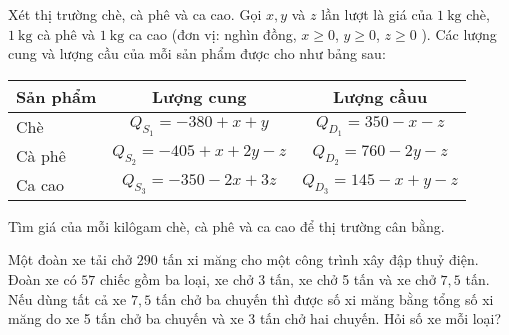 \begin{vd}%
	Xét thị trường chè, cà phê và ca cao. Gọi $x, y$ và $z$ lần lượt là giá của $1 \mathrm{~kg}$ chè, $1 \mathrm{~kg}$ cà phê và $1 \mathrm{~kg}$ ca cao (đơn vị: nghìn đồng, $x \geq 0$, $y \geq 0$, $z \geq 0$ ). Các lượng cung và lượng cầu của mỗi sản phẩm được cho như bảng sau:\begin{center}
	\begin{tabular}{|l|c|c|}
		\hline \multicolumn{1}{|c|}{ Sản phẩm } & Lượng cung & Lượng cầuu \\
		\hline Chè & $Q_{S_1}=-380+x+y$ & $Q_{D_1}=350-x-z$ \\
		\hline Cà phê & $Q_{S_2}=-405+x+2 y-z$ & $Q_{D_2}=760-2 y-z$ \\
		\hline Ca cao & $Q_{S_3}=-350-2 x+3 z$ & $Q_{D_3}=145-x+y-z$ \\
		\hline
	\end{tabular}
\end{center}
	Tìm giá của mỗi kilôgam chè, cà phê và ca cao để thị trường cân bằng.
	\end{vd}
\begin{vd}%
	Một đoàn xe tải chở $290$ tấn xi măng cho một công trình xây đập thuỷ điện. Đoàn xe có $57$ chiếc gồm ba loại, xe chở 3 tấn, xe chở 5 tấn và xe chở $7{,}5$ tấn. Nếu dùng tất cả xe $7{,}5$ tấn chở ba chuyến thì được số xi măng bằng tổng số xi măng do xe 5 tấn chở ba chuyến và xe 3 tấn chở hai chuyến. Hỏi số xe mỗi loại?
\end{vd}
